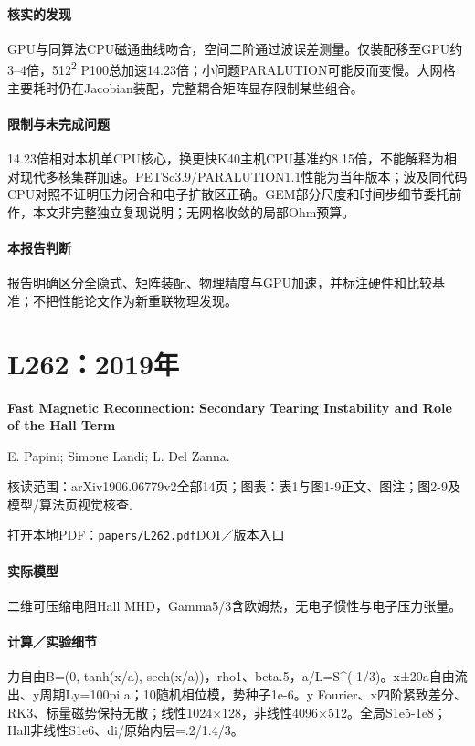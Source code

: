 \paragraph{核实的发现}GPU与同算法CPU磁通曲线吻合，空间二阶通过波误差测量。仅装配移至GPU约3–4倍，512\textsuperscript{2} P100总加速14.23倍；小问题PARALUTION可能反而变慢。大网格主要耗时仍在Jacobian装配，完整耦合矩阵显存限制某些组合。

\paragraph{限制与未完成问题}14.23倍相对本机单CPU核心，换更快K40主机CPU基准约8.15倍，不能解释为相对现代多核集群加速。PETSc3.9/PARALUTION1.1性能为当年版本；波及同代码CPU对照不证明压力闭合和电子扩散区正确。GEM部分尺度和时间步细节委托前作，本文非完整独立复现说明；无网格收敛的局部Ohm预算。

\paragraph{本报告判断}报告明确区分全隐式、矩阵装配、物理精度与GPU加速，并标注硬件和比较基准；不把性能论文作为新重联物理发现。

\section{L262：2019年}\label{paper:L262}

\textbf{Fast Magnetic Reconnection: Secondary Tearing Instability and Role of the Hall Term}\citep{L262}\

E. Papini;  Simone Landi;  L. Del Zanna.

\textsf{核读范围：}arXiv1906.06779v2全部14页；\textsf{图表：}表1与图1-9正文、图注；图2-9及模型/算法页视觉核查.

\href{run:papers/L262.pdf}{打开本地PDF：\texttt{papers/L262.pdf}}\quad\href{https://doi.org/10.3847/1538-4357/ab4352}{DOI／版本入口}

\paragraph{实际模型}二维可压缩电阻Hall MHD，Gamma5/3含欧姆热，无电子惯性与电子压力张量。

\paragraph{计算／实验细节}力自由B=(0, tanh(x/a), sech(x/a))，rho1、beta.5，a/L=S\textasciicircum{}(-1/3)。x±20a自由流出、y周期Ly=100pi a；10随机相位模，势种子1e-6。y Fourier、x四阶紧致差分、RK3、标量磁势保持无散；线性1024×128，非线性4096×512。全局S1e5-1e8；Hall非线性S1e6、di/原始内层=.2/1.4/3。


